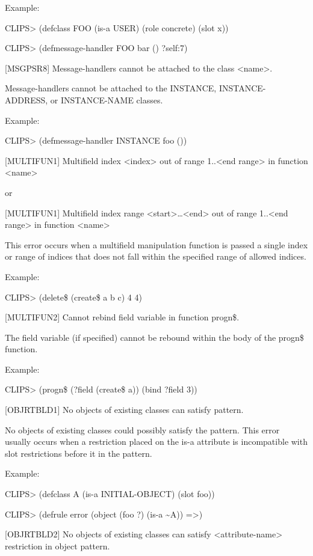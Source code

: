 \documentclass[letterpaper,10pt,english]{sphinxmanual}
\begin{document}
Example:

CLIPS\textgreater{} (defclass FOO (is-a USER) (role concrete) (slot x))

CLIPS\textgreater{} (defmessage-handler FOO bar () ?self:7)

{[}MSGPSR8{]} Message-handlers cannot be attached to the class \textless{}name\textgreater{}.

Message-handlers cannot be attached to the INSTANCE, INSTANCE-ADDRESS,
or INSTANCE-NAME classes.

Example:

CLIPS\textgreater{} (defmessage-handler INSTANCE foo ())

{[}MULTIFUN1{]} Multifield index \textless{}index\textgreater{} out of range 1..\textless{}end range\textgreater{} in
function \textless{}name\textgreater{}

or

{[}MULTIFUN1{]} Multifield index range \textless{}start\textgreater{}…\textless{}end\textgreater{} out of range 1..\textless{}end
range\textgreater{} in function \textless{}name\textgreater{}

This error occurs when a multifield manipulation function is passed a
single index or range of indices that does not fall within the specified
range of allowed indices.

Example:

CLIPS\textgreater{} (delete\$ (create\$ a b c) 4 4)

{[}MULTIFUN2{]} Cannot rebind field variable in function progn\$.

The field variable (if specified) cannot be rebound within the body of
the progn\$ function.

Example:

CLIPS\textgreater{} (progn\$ (?field (create\$ a)) (bind ?field 3))

{[}OBJRTBLD1{]} No objects of existing classes can satisfy pattern.

No objects of existing classes could possibly satisfy the pattern. This
error usually occurs when a restriction placed on the is-a attribute is
incompatible with slot restrictions before it in the pattern.

Example:

CLIPS\textgreater{} (defclass A (is-a INITIAL-OBJECT) (slot foo))

CLIPS\textgreater{} (defrule error (object (foo ?) (is-a \textasciitilde{}A)) =\textgreater{})

{[}OBJRTBLD2{]} No objects of existing classes can satisfy \textless{}attribute-name\textgreater{}
restriction in object pattern.
\end{document}
